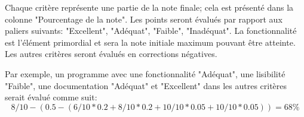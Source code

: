 Chaque critère représente une partie de la note finale; cela est présenté dans la colonne "Pourcentage de la note". Les points seront évalués par rapport aux paliers suivants: "Excellent", "Adéquat", "Faible", "Inadéquat". La fonctionnalité est l'élément primordial et sera la note initiale maximum pouvant être atteinte. Les autres critères seront évalués en corrections négatives.

Par exemple, un programme avec une fonctionnalité "Adéquat", une lisibilité "Faible", une documentation "Adéquat" et "Excellent" dans les autres critères serait évalué comme suit:
$$8/10 - (0.5 - (6/10 * 0.2 + 8/10 * 0.2 + 10/10 * 0.05 + 10/10 * 0.05)) = 68\%$$
